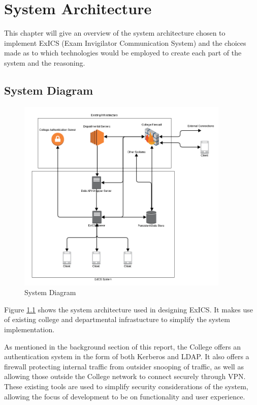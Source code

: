 \chapter{System Architecture}

\label{ch:systemarchitecture}

This chapter will give an overview of the system architecture chosen to implement ExICS (Exam Invigilator Communication System) and the choices made as to which technologies would be employed to create each part of the system and the reasoning.

\section{System Diagram}

\FloatBarrier

\begin{figure}[!htbp]
	\centering
	\includegraphics[width=0.9\textwidth]{"System Diagram/exics_system_diagram"}
	\caption{System Diagram}
	\label{fig:system_diagram}
\end{figure}

Figure \ref{fig:system_diagram} shows the system architecture used in designing ExICS.  It makes use of existing college and departmental infrastucture to simplify the system implementation.

As mentioned in the background section of this report, the College offers an authentication system in the form of both Kerberos and LDAP.  It also offers a firewall protecting internal traffic from outsider snooping of traffic, as well as allowing those outside the College network to connect securely through VPN.  These existing tools are used to simplify security considerations of the system, allowing the focus of development to be on functionality and user experience.

